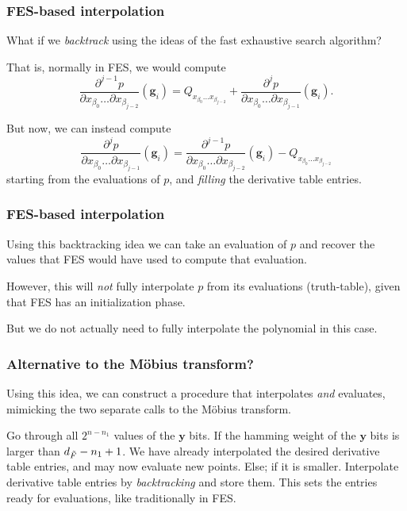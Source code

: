 \documentclass{beamer}
\begin{document}
\begin{frame}
    \frametitle{FES-based interpolation}
    What if we \textit{backtrack} using the ideas of the fast exhaustive search algorithm?

    \pause

    That is, normally in FES, we would compute 
    $$
        \frac{\partial^{j - 1} p}{\partial x_{\beta_0} \dots \partial x_{\beta_{j - 2}}}(\mathbf{g}_i) = Q_{x_{\beta_0} \dots x_{\beta_{j - 2}}} + \frac{\partial^j p}{\partial x_{\beta_0} \dots \partial x_{\beta_{j - 1}}}(\mathbf{g}_i).
    $$
    
    \pause

    But now, we can instead compute 
    $$
        \frac{\partial^j p}{\partial x_{\beta_0} \dots \partial x_{\beta_{j - 1}}}(\mathbf{g}_i) = \frac{\partial^{j - 1} p}{\partial x_{\beta_0} \dots \partial x_{\beta_{j - 2}}}(\mathbf{g}_i) - Q_{x_{\beta_0} \dots x_{\beta_{j - 2}}}
    $$
    starting from the evaluations of $p$, and \textit{filling} the derivative table entries. 
\end{frame}

\begin{frame}
    \frametitle{FES-based interpolation}
    Using this backtracking idea we can take an evaluation of $p$ and recover the values that FES would have used to compute that evaluation.

    \pause 

    However, this will \textit{not} fully interpolate $p$ from its evaluations (truth-table), given that FES has an initialization phase.

    \pause

    But we do not actually need to fully interpolate the polynomial in this case.
\end{frame}

\begin{frame}
    \frametitle{Alternative to the Möbius transform?}
    Using this idea, we can construct a procedure that interpolates \textit{and} evaluates, mimicking the two separate calls to the Möbius transform.

    \begin{outline}
        \1 Go through all $2^{n - n_1}$ values of the $\mathbf{y}$ bits.
            \2 If the hamming weight of the $\mathbf{y}$ bits is larger than $d_{\Tilde{F}} - n_1 + 1$.
                \3 We have already interpolated the desired derivative table entries, and may now evaluate new points.
            \2 Else; if it is smaller.
                \3 Interpolate derivative table entries by \textit{backtracking} and store them. This sets the entries ready for evaluations, like traditionally in FES.
    \end{outline}
\end{frame}
\end{document}

